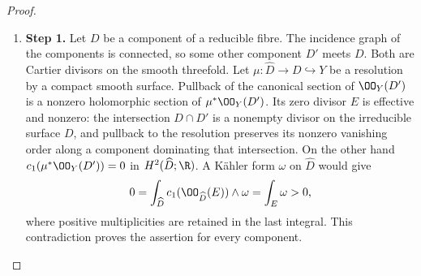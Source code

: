 \begin{proof}
\begin{enumerate}[label={$\langle1\rangle$\arabic*.},leftmargin=*]
\item 
\noindent\textbf{Step 1.} Let $D$ be a component of a reducible fibre. The incidence graph of
the components is connected, so some other component $D'$ meets $D$.
Both are Cartier divisors on the smooth threefold. Let
$\mu:\widehat D\to D\hookrightarrow Y$ be a resolution by a compact
smooth surface. Pullback of the canonical section of $\OO_Y(D')$
is a nonzero holomorphic section of $\mu^*\OO_Y(D')$. Its zero
divisor $E$ is effective and nonzero: the intersection $D\cap D'$
is a nonempty divisor on the irreducible surface $D$, and pullback
to the resolution preserves its nonzero vanishing order along a
component dominating that intersection. On the other hand
$c_1(\mu^*\OO_Y(D'))=0$ in $H^2(\widehat D;\R)$.
A K\"ahler form $\omega$ on $\widehat D$ would give
\[
0=\int_{\widehat D}c_1(\OO_{\widehat D}(E))\wedge\omega
 =\int_E\omega>0,
\]
where positive multiplicities are retained in the last integral.
This contradiction proves the assertion for every component.

\end{enumerate}
\end{proof}
